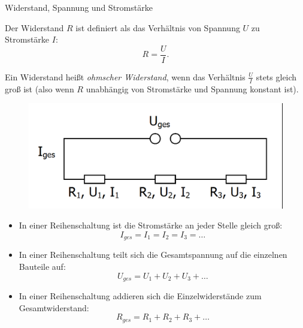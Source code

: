 \begin{zsfg}{{Widerstand, Spannung und Stromstärke}}
	\begin{figure}
		\vspace{-\baselineskip}
	\end{figure}
	Der Widerstand $R$ ist definiert als das Verhältnis von Spannung $U$ zu Stromstärke $I$:
	\begin{equation*}
		R=\frac{U}{I}.
	\end{equation*}
	
	Ein Widerstand heißt \emph{ohmscher Widerstand}, wenn das Verhältnis $\frac{U}{I}$ stets gleich groß ist (also wenn $R$ unabhängig von Stromstärke und Spannung konstant ist).
\end{zsfg}
\begin{tcolorbox}[equal height group=A,enhanced, colback=CadetBlue!70!green, coltext=black, colframe=DarkCyan!70!DarkGreen, width=0.48\textwidth, before=, after=\hfill, adjusted title={Elektrische Stromstärke und Spannung in der Reihenschaltung}, colbacktitle=CadetBlue!70!green, coltitle=black, fonttitle=\bfseries]
	\begin{figure}[H]
		\centering
		\includegraphics[width=\textwidth]{./Zeichnungen/reihenschaltung.png}
	\end{figure}
	\begin{itemize}[parsep=0ex,itemsep=0ex,leftmargin=*]
		\item In einer Reihenschaltung ist die Stromstärke an jeder Stelle gleich groß:
		\begin{equation*}
			I_{ges}=I_1=I_2= I_3=\dots
		\end{equation*}
		\item In einer Reihenschaltung teilt sich die Gesamtspannung auf die einzelnen Bauteile auf:
		\begin{equation*}
			U_{ges}=U_1 + U_2 + U_3+\dots
		\end{equation*}
		\item In einer Reihenschaltung addieren sich die Einzelwiderstände zum Gesamtwiderstand:
		\begin{equation*}
			R_{ges}=R_1+R_2+R_3+\dots
		\end{equation*}
	\end{itemize}
\end{tcolorbox}
